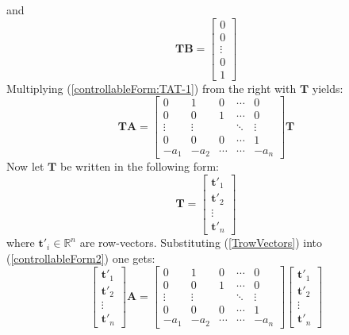 \documentclass[a4paper,10pt,oneside]{book}
\begin{document}
and
\begin{equation}\label{TBcontrollableForm}
 \mathbf{TB}=\left[ {\begin{array}{c}
 0\\
 0\\
 \vdots\\
 0\\
 1\end{array} } \right]
\end{equation}
Multiplying (\ref{controllableForm:TAT-1}) from the right with $\mathbf{T}$ yields:
\begin{equation}\label{controllableForm2}
 \mathbf{TA}=\left[ {\begin{array}{ccccc}
 0&1&0&\cdots&0 \\
 0&0&1&\cdots&0 \\
 \vdots&\vdots&&\ddots&\vdots\\
 0&0&0&\cdots&1 \\
-a_1&-a_2&\cdots&\cdots&-a_n\end{array} } \right]\mathbf{T}
\end{equation}
Now let $\mathbf{T}$ be written in the following form:
\begin{equation}\label{TrowVectors}
 \mathbf{T}=\left[ {\begin{array}{c}
 \mathbf{t}'_1\\
 \mathbf{t}'_2\\
 \vdots\\
 \mathbf{t}'_n\end{array} } \right]
\end{equation}
where $\mathbf{t}'_i \in \mathbb{R}^n$ are row-vectors. Substituting (\ref{TrowVectors}) into (\ref{controllableForm2}) one gets:
\begin{equation}
 \left[ {\begin{array}{c}
 \mathbf{t}'_1\\
 \mathbf{t}'_2\\
 \vdots\\
 \mathbf{t}'_n\end{array} } \right]\mathbf{A}=\left[ {\begin{array}{ccccc}
 0&1&0&\cdots&0 \\
 0&0&1&\cdots&0 \\
 \vdots&\vdots&&\ddots&\vdots\\
 0&0&0&\cdots&1 \\
-a_1&-a_2&\cdots&\cdots&-a_n\end{array} } \right]\left[ {\begin{array}{c}
 \mathbf{t}'_1\\
 \mathbf{t}'_2\\
 \vdots\\
 \mathbf{t}'_n\end{array} } \right]
\end{equation}
\end{document}
